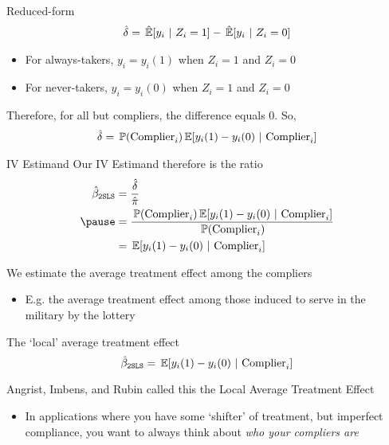 \documentclass[aspectratio=169,t,11pt,table]{beamer}
\begin{document}
\begin{frame}{Reduced-form}
  \vspace*{-\bigskipamount}
  \begin{align*}
    \hat{\delta} = \expechat{y_i}{Z_i = 1} - \expechat{y_i}{Z_i = 0}
  \end{align*}
  \vspace*{-\bigskipamount}
  \begin{itemize}
    \item For always-takers, $y_i = y_i(1)$ when $Z_i = 1$ and $Z_i = 0$
    \item For never-takers, $y_i = y_i(0)$ when $Z_i = 1$ and $Z_i = 0$
  \end{itemize}

  \bigskip
  Therefore, for all but compliers, the difference equals 0. So, 
  \begin{align*}
    \hat{\delta} = \prob{\text{Complier}_i} \expec{y_i(1) - y_i(0)}{\text{Complier}_i}
  \end{align*}
\end{frame}

\begin{frame}{IV Estimand}
  Our IV Estimand therefore is the ratio 
  \begin{align*}
    \hat{\beta}_{\texttt{2SLS}} &= 
    \frac{\hat{\delta}}{\hat{\pi}} \\
    \pause
    &= \frac{\prob{\text{Complier}_i} \expec{y_i(1) - y_i(0)}{\text{Complier}_i}}{\prob{\text{Complier}_i}} \\
    &= \expec{y_i(1) - y_i(0)}{\text{Complier}_i}
  \end{align*}
 
  \bigskip
  We estimate the average treatment effect among the compliers
  \begin{itemize}
    \item E.g. the average treatment effect among those induced to serve in the military by the lottery
  \end{itemize}
\end{frame}

\begin{frame}{The `local' average treatment effect}
  \vspace*{-\bigskipamount}
  $$
    \hat{\beta}_{\texttt{2SLS}} = \expec{y_i(1) - y_i(0)}{\text{Complier}_i}
  $$

  Angrist, Imbens, and Rubin called this the \alert{Local Average Treatment Effect} 
  \begin{itemize}
    \item In applications where you have some `shifter' of treatment, but imperfect compliance, you want to always think about \emph{who your compliers are}
  \end{itemize}
\end{frame}
\end{document}
